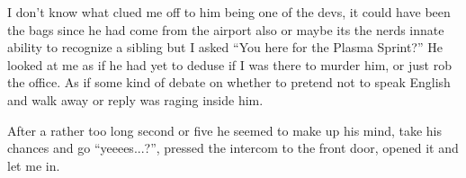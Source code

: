 I don’t know what clued me off to him being one of the devs, it could have been the bags since he had come from the airport also or maybe its the nerds innate ability to recognize a sibling but I asked “You here for the Plasma Sprint?” 
He looked at me as if he had yet to deduse if I was there to murder him, or just rob the office. As if some kind of debate on whether to pretend not to speak English and walk away or reply was raging inside him. 

After a rather too long second or five he seemed to make up his mind, take his chances and go “yeeees...?”, pressed the intercom to the front door, opened it and let me in.